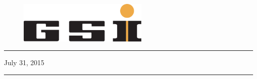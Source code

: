 \begin{titlepage}

\begin{figure}[h]
  \includegraphics[height=2cm]{fig/gsi-logo}
\end{figure}

\vspace*{5cm}


\noindent \rule{\textwidth}{.1cm}

\hfill July 31, 2015

\vfill


\noindent \rule{\textwidth}{.05cm}

\end{titlepage}
